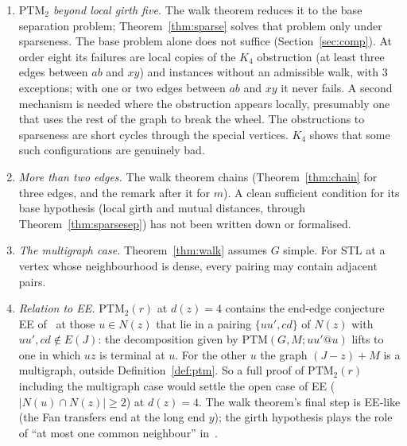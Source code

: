 \documentclass[11pt]{amsart}
\theoremstyle{definition}
\newcommand{\PTM}{\mathrm{PTM}}
\begin{document}
\begin{enumerate}
So the composition route at the open part of T(6)-i needs two things. For $C_4$ it needs one
protected step. For the other shapes it needs a finer tracking than vertex sets: what must avoid
$x_i$ is only the path \emph{ending} at $y_i$, not every path through $y_i$. Alternatively, a chain
design whose walks use the edges $x_iy_i$ and $y_2y_3$ of $J-z$ would do. A sparse form along the lines of
Theorem~\ref{thm:sparse} needs the six special vertices sparse and four sets packed, so local
girth and distance conditions between the three edges; a proof for dense neighbourhoods needs a
new mechanism, as at $d(z)=4$. Theorem~\ref{thm:chain}, Proposition~\ref{prop:far} and
Corollary~\ref{cor:six} are formalised (Section~\ref{sec:lean}).
\item \emph{$\PTM_2$ beyond local girth five.} The walk theorem reduces it to the base separation
problem; Theorem~\ref{thm:sparse} solves that problem only under sparseness. The base problem
alone does not suffice (Section~\ref{sec:comp}). At order eight its failures are local copies of
the $K_4$ obstruction (at least three edges between $ab$ and $xy$) and instances without an
admissible walk, with $3$ exceptions; with one or two edges between $ab$ and $xy$ it never fails.
A second mechanism is needed where the obstruction appears locally, presumably one that uses the
rest of the graph to break the wheel. The obstructions to
sparseness are short cycles through the special vertices. $K_4$ shows that some such
configurations are genuinely bad.
\item \emph{More than two edges.} The walk theorem chains (Theorem~\ref{thm:chain} for three
edges, and the remark after it for $m$). A clean sufficient condition for its base hypothesis
(local girth and mutual distances, through Theorem~\ref{thm:sparsesep}) has not been written down
or formalised.
\item \emph{The multigraph case.} Theorem~\ref{thm:walk} assumes $G$ simple. For STL at a vertex
whose neighbourhood is dense, every pairing may contain adjacent pairs.
\item \emph{Relation to EE.} $\PTM_2(r)$ at $d(z)=4$ contains the end-edge conjecture EE of~\cite{PE}
at those $u\in N(z)$ that lie in a pairing $\{uu',cd\}$ of $N(z)$ with $uu',cd\notin E(J)$: the
decomposition given by $\PTM(G,M;uu'@u)$ lifts to one in which $uz$ is terminal at $u$. For the
other $u$ the graph $(J-z)+M$ is a multigraph, outside Definition~\ref{def:ptm}. So a full proof
of $\PTM_2(r)$ including the multigraph case would settle the open case of EE
($|N(u)\cap N(z)|\ge2$) at $d(z)=4$. The walk theorem's final
step is EE-like (the Fan transfers end at the long end $y$); the girth hypothesis plays the role
of ``at most one common neighbour'' in~\cite[Theorem~5.1]{PE}.
\end{enumerate}
\end{document}
